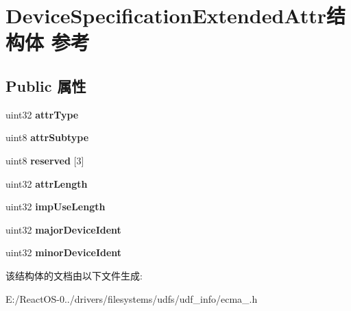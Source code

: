 \hypertarget{struct_device_specification_extended_attr}{}\section{Device\+Specification\+Extended\+Attr结构体 参考}
\label{struct_device_specification_extended_attr}
\subsection*{Public 属性}
\begin{DoxyCompactItemize}
\item 
\mbox{\label{struct_device_specification_extended_attr_a4e79fe736c3b95114eba98c24bf35d00}} 
uint32 {\bfseries attr\+Type}
\item 
\mbox{\label{struct_device_specification_extended_attr_a9e2b22d0eb66764136be451610132313}} 
uint8 {\bfseries attr\+Subtype}
\item 
\mbox{\label{struct_device_specification_extended_attr_a15b3d4052c907d15b6f19daf2825d97d}} 
uint8 {\bfseries reserved} \mbox{[}3\mbox{]}
\item 
\mbox{\label{struct_device_specification_extended_attr_a83cc54f5a36098b58ece2f616bc4f77b}} 
uint32 {\bfseries attr\+Length}
\item 
\mbox{\label{struct_device_specification_extended_attr_a7f0b5b557fefe37a9efe94d1f8d25652}} 
uint32 {\bfseries imp\+Use\+Length}
\item 
\mbox{\label{struct_device_specification_extended_attr_ab48cc08382acaac8ec957b927cb48b06}} 
uint32 {\bfseries major\+Device\+Ident}
\item 
\mbox{\label{struct_device_specification_extended_attr_a0fc5b57b12146418c333a02b72004dcf}} 
uint32 {\bfseries minor\+Device\+Ident}
\end{DoxyCompactItemize}


该结构体的文档由以下文件生成\+:\begin{DoxyCompactItemize}
\item 
E\+:/\+React\+O\+S-\/0../drivers/filesystems/udfs/udf\+\_\+info/ecma\+\_.\+h\end{DoxyCompactItemize}
